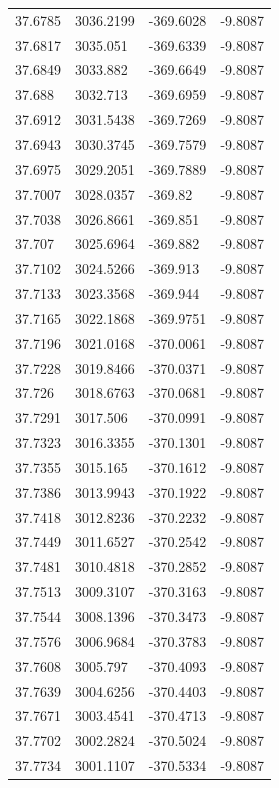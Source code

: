 \begin{table}[H]
\begin{tabular}{llll}
37.6785 & 3036.2199 & -369.6028 & -9.8087 \\
37.6817 & 3035.051 & -369.6339 & -9.8087 \\
37.6849 & 3033.882 & -369.6649 & -9.8087 \\
37.688 & 3032.713 & -369.6959 & -9.8087 \\
37.6912 & 3031.5438 & -369.7269 & -9.8087 \\
37.6943 & 3030.3745 & -369.7579 & -9.8087 \\
37.6975 & 3029.2051 & -369.7889 & -9.8087 \\
37.7007 & 3028.0357 & -369.82 & -9.8087 \\
37.7038 & 3026.8661 & -369.851 & -9.8087 \\
37.707 & 3025.6964 & -369.882 & -9.8087 \\
37.7102 & 3024.5266 & -369.913 & -9.8087 \\
37.7133 & 3023.3568 & -369.944 & -9.8087 \\
37.7165 & 3022.1868 & -369.9751 & -9.8087 \\
37.7196 & 3021.0168 & -370.0061 & -9.8087 \\
37.7228 & 3019.8466 & -370.0371 & -9.8087 \\
37.726 & 3018.6763 & -370.0681 & -9.8087 \\
37.7291 & 3017.506 & -370.0991 & -9.8087 \\
37.7323 & 3016.3355 & -370.1301 & -9.8087 \\
37.7355 & 3015.165 & -370.1612 & -9.8087 \\
37.7386 & 3013.9943 & -370.1922 & -9.8087 \\
37.7418 & 3012.8236 & -370.2232 & -9.8087 \\
37.7449 & 3011.6527 & -370.2542 & -9.8087 \\
37.7481 & 3010.4818 & -370.2852 & -9.8087 \\
37.7513 & 3009.3107 & -370.3163 & -9.8087 \\
37.7544 & 3008.1396 & -370.3473 & -9.8087 \\
37.7576 & 3006.9684 & -370.3783 & -9.8087 \\
37.7608 & 3005.797 & -370.4093 & -9.8087 \\
37.7639 & 3004.6256 & -370.4403 & -9.8087 \\
37.7671 & 3003.4541 & -370.4713 & -9.8087 \\
37.7702 & 3002.2824 & -370.5024 & -9.8087 \\
37.7734 & 3001.1107 & -370.5334 & -9.8087 \\

\end{tabular}
\end{table}
